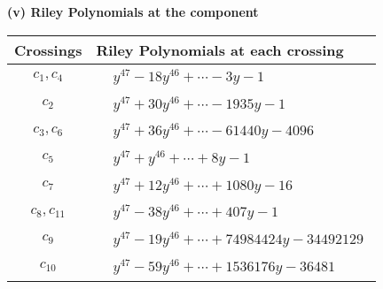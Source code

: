 \documentclass[1p]{elsarticle_modified}
\theoremstyle{definition}
\begin{document}
\newpage\renewcommand{\arraystretch}{1}
\flushleft \textbf{(v) Riley Polynomials at the component}\newline \\
\begin{tabular}{m{50pt}|m{274pt}}
Crossings & \hspace{64pt}Riley Polynomials at each crossing \\
\hline $$\begin{aligned}c_{1},c_{4}\end{aligned}$$&$\begin{aligned}
&y^{47}-18 y^{46}+\cdots-3 y-1
\end{aligned}$\\
\hline $$\begin{aligned}c_{2}\end{aligned}$$&$\begin{aligned}
&y^{47}+30 y^{46}+\cdots-1935 y-1
\end{aligned}$\\
\hline $$\begin{aligned}c_{3},c_{6}\end{aligned}$$&$\begin{aligned}
&y^{47}+36 y^{46}+\cdots-61440 y-4096
\end{aligned}$\\
\hline $$\begin{aligned}c_{5}\end{aligned}$$&$\begin{aligned}
&y^{47}+y^{46}+\cdots+8 y-1
\end{aligned}$\\
\hline $$\begin{aligned}c_{7}\end{aligned}$$&$\begin{aligned}
&y^{47}+12 y^{46}+\cdots+1080 y-16
\end{aligned}$\\
\hline $$\begin{aligned}c_{8},c_{11}\end{aligned}$$&$\begin{aligned}
&y^{47}-38 y^{46}+\cdots+407 y-1
\end{aligned}$\\
\hline $$\begin{aligned}c_{9}\end{aligned}$$&$\begin{aligned}
&y^{47}-19 y^{46}+\cdots+74984424 y-34492129
\end{aligned}$\\
\hline $$\begin{aligned}c_{10}\end{aligned}$$&$\begin{aligned}
&y^{47}-59 y^{46}+\cdots+1536176 y-36481
\end{aligned}$\\
\hline
\end{tabular}\\~\\
\end{document}
